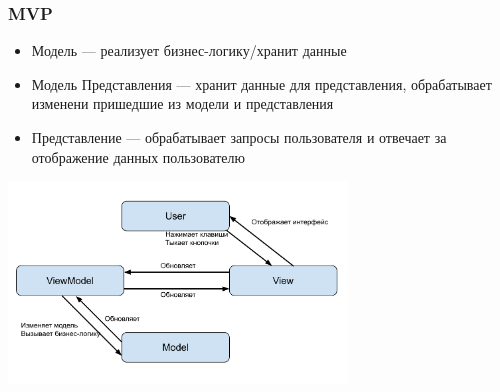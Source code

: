 \documentclass[aspectratio=169]{beamer}
\begin{document}
\begin{frame}[fragile]
  \transwipe[direction=90]
  \frametitle{MVP}
  \begin{minipage}{.4\textwidth}
    \begin{itemize}
      \item Модель --- реализует бизнес-логику/хранит данные
      \item Модель Представления --- хранит данные для представления, обрабатывает изменени пришедшие из модели и представления
      \item Представление --- обрабатывает запросы пользователя и отвечает за отображение данных пользователю
    \end{itemize}
  \end{minipage}
  \begin{minipage}{.56\textwidth}
    \includegraphics[width=9cm]{pictures/MVVM.pdf}
  \end{minipage}

\end{frame}
\end{document}
